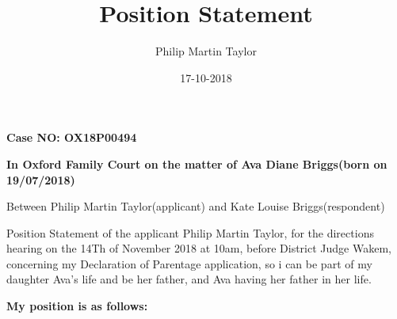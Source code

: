 \documentclass[10pt,a4paper]{book}
\date{17-10-2018}
\author{Philip Martin Taylor}
\title{Position Statement}
\begin{document}
 
\begin{flushright} 
  \textbf{Case NO: OX18P00494}
\end{flushright}
\begin{flushright}
  \textbf{In Oxford Family Court on the matter of Ava Diane Briggs(born on 19/07/2018)}
\end{flushright} 
\begin{flushleft}
  Between Philip Martin Taylor(applicant) and Kate Louise Briggs(respondent)
\end{flushleft} 
\begin{flushleft}
  Position Statement of the applicant Philip Martin Taylor, for the directions hearing on the 14Th of November 2018 at 10am, before District Judge Wakem, concerning my Declaration of Parentage application, so i can be part of my daughter Ava's life and be her father, and Ava having her father in her life.
\end{flushleft}
\begin{flushleft}
  \textbf{My position is as follows:}
\end{flushleft}
\end{document}
